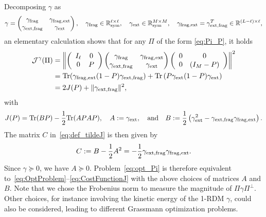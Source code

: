 \documentclass{article}
\def\R{\mathbb R}
\newcommand{\tr}{{\rm Tr}}
\newcommand{\1}{{\mathds 1}}
\begin{document}
Decomposing $\gamma$ as
\begin{align}
\label{rdm1_basis1}
     \gamma = \begin{pmatrix}
        \gamma_{\rm frag } & \gamma_{{\rm frag}, \rm ext}\\
        \gamma_{{\rm ext}, \rm frag} & \gamma_{\rm ext} \end{pmatrix}, \quad \gamma_{\rm frag } \in \R^{\ell \times \ell}_{\rm sym}, \quad   \gamma_{\rm ext} \in \R^{M \times M}_{\rm sym}, \quad \gamma_{{\rm frag}, \rm ext} = \gamma_{{\rm ext}, \rm frag}^T \in \mathbb{R}^{(L-\ell) \times \ell},
\end{align}
an elementary calculation shows that for any $\Pi$ of the form \eqref{eq:Pi_P}, it holds
\begin{align*}
\mathcal J^\gamma(\Pi) &= \left\| \left( \begin{array}{cc} I_{\ell} & 0  \\ 0 & P \end{array} \right) \begin{pmatrix}
        \gamma_{\rm frag } & \gamma_{{\rm frag}, \rm ext}\\
        \gamma_{{\rm ext}, \rm frag} & \gamma_{\rm ext} \end{pmatrix} \left( \begin{array}{cc} 0 & 0  \\ 0 & (I_M-P) \end{array} \right) \right\|^2 \\
        &= \tr(\gamma_{{\rm frag}, \rm ext}(1-P) \gamma_{{\rm ext},{\rm frag}}) + \tr\left( P \gamma_{\rm ext } (1-P) \gamma_{\rm ext } \right) \\
        &= 2 J(P) + \|\gamma_{{\rm ext}, \rm frag}\|^2,
\end{align*}
with
\begin{equation}\label{eq:BCP-AB}
J(P) = \tr(BP)-\frac 12 \tr(APAP), \quad  A:= \gamma_{\rm ext }, \quad \mbox{and} \quad B:=\frac 12 \left(\gamma_{\rm ext }^2- \gamma_{{\rm ext}, \rm frag} \gamma_{{\rm frag}, \rm ext}  \right).
\end{equation}
The matrix $C$ in~\eqref{eq:def_tildeJ} is then given by 
\begin{equation}\label{eq:BCP-C}
C:=B-\frac 12 A^2 = - \frac 12 \gamma_{{\rm ext}, \rm frag} \gamma_{{\rm frag}, \rm ext} .
\end{equation}
Since $\gamma \succeq 0$, we have $A \succeq 0$.
Problem~\eqref{eq:opt_Pi} is therefore equivalent to~\eqref{eq:OptProblem}--\eqref{eq:CostFunctionJ} with the above choices of matrices $A$ and $B$.
Note that we chose the Frobenius norm to measure the magnitude of $\Pi\gamma\Pi^\perp$. Other choices, for instance involving the kinetic energy of the 1-RDM $\gamma$, could also be considered, leading to different Grassmann optimization problems. 
\end{document}

